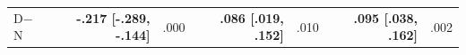 \documentclass[letterpaper]{article} %
\begin{document}
\begin{table}[t!]
\begin{tabular}{@{}l rr rr rr@{}}
D$-$N & \textbf{-.217 [-.289, -.144]} & .000 & \textbf{.086 [.019, .152]} & .010 & \textbf{.095 [.038, .162]} & .002\\ %

\end{tabular}
\end{table}
\end{document}
